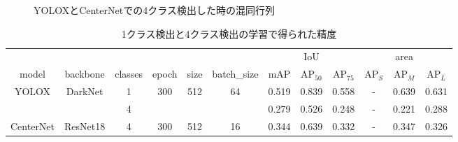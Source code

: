 \documentclass[a4j]{ujarticle}
\begin{document}
\begin{itemize}
            \begin{figure}[h]
                \centering
                \caption{YOLOX\cite{yolox}とCenterNet\cite{centernet}での4クラス検出した時の混同行列}
            \end{figure}

            \begin{table}[h]
                \centering
                \caption{1クラス検出と4クラス検出の学習で得られた精度}
                \label{tab:compare_models}
                \begin{tabular}{cccccc|ccc|ccc}
                    & & & & & & & IoU & & & area & \\
                    model & backbone & classes & epoch & size & batch\_size & mAP & AP$_{50}$ & AP$_{75}$ & AP$_S$ & AP$_M$ & AP$_L$ \\ \hline
                    \multirow{2}{*}{YOLOX\cite{yolox}} & \multirow{2}{*}{DarkNet} & 1 & \multirow{2}{*}{300} & \multirow{2}{*}{512} & \multirow{2}{*}{64} & 0.519 & 0.839 & 0.558 & - & 0.639 & 0.631 \\
                    &  & 4 &  &  &  & 0.279 & 0.526 & 0.248 & - & 0.221 & 0.288 \\ \hline
                    CenterNet\cite{centernet} & ResNet18 & 4 & 300 & 512 & 16 & 0.344 & 0.639 & 0.332 & - & 0.347 & 0.326
                \end{tabular}
            \end{table}


\end{itemize}
\end{document}
